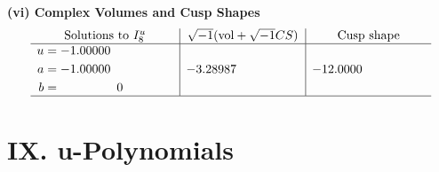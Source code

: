 \documentclass[1p]{elsarticle_modified}
\theoremstyle{definition}
\newcommand{\I}{\sqrt{-1}}
\begin{document}
\newpage\flushleft \textbf{(vi) Complex Volumes and Cusp Shapes}
$$\begin{array}{c|c|c}  
\text{Solutions to }I^u_{8}& \I (\text{vol} + \sqrt{-1}CS) & \text{Cusp shape}\\
 \hline 
\begin{aligned}
u &= -1.00000\phantom{ +0.000000I} \\
a &= -1.00000\phantom{ +0.000000I} \\
b &= \phantom{-0.000000 } 0\end{aligned}
 & -3.28987\phantom{ +0.000000I} & -12.0000\phantom{ +0.000000I}\\
 \hline 
 \end{array}$$\newpage
\newpage\renewcommand{\arraystretch}{1}
\centering \section*{ IX. u-Polynomials}
\end{document}

